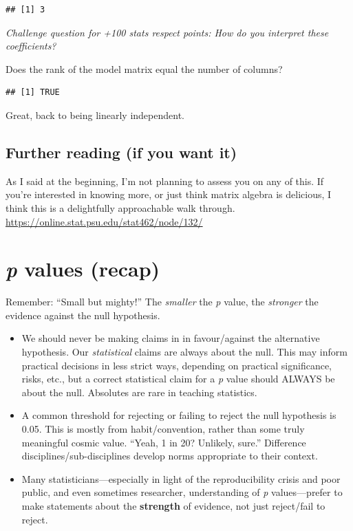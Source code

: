 \documentclass[
  openany]{book}
\providecommand{\tightlist}{%
  \setlength{\itemsep}{0pt}\setlength{\parskip}{0pt}}
\begin{document}
\begin{verbatim}
## [1] 3
\end{verbatim}

\emph{Challenge question for +100 stats respect points: How do you interpret these coefficients?}

Does the rank of the model matrix equal the number of columns?

\begin{verbatim}
## [1] TRUE
\end{verbatim}

Great, back to being linearly independent.

\hypertarget{further-reading-if-you-want-it}{%
\subsection{Further reading (if you want it)}\label{further-reading-if-you-want-it}}

As I said at the beginning, I'm not planning to assess you on any of this. If you're interested in knowing more, or just think matrix algebra is delicious, I think this is a delightfully approachable walk through. \url{https://online.stat.psu.edu/stat462/node/132/}

\hypertarget{p-values-recap}{%
\section{\texorpdfstring{\emph{p} values (recap)}{p values (recap)}}\label{p-values-recap}}

Remember: ``Small but mighty!'' The \emph{smaller} the \emph{p} value, the \emph{stronger} the evidence against the null hypothesis.

\begin{itemize}
\tightlist
\item
  We should never be making claims in in favour/against the alternative hypothesis. Our \emph{statistical} claims are always about the null. This may inform practical decisions in less strict ways, depending on practical significance, risks, etc., but a correct statistical claim for a \emph{p} value should ALWAYS be about the null. Absolutes are rare in teaching statistics.\\
\item
  A common threshold for rejecting or failing to reject the null hypothesis is 0.05. This is mostly from habit/convention, rather than some truly meaningful cosmic value. ``Yeah, 1 in 20? Unlikely, sure.'' Difference disciplines/sub-disciplines develop norms appropriate to their context.
\item
  Many statisticians---especially in light of the reproducibility crisis and poor public, and even sometimes researcher, understanding of \emph{p} values---prefer to make statements about the \textbf{strength} of evidence, not just reject/fail to reject.
\end{itemize}
\end{document}
